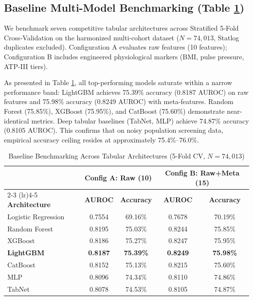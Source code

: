 \documentclass[journal]{IEEEtran}
\begin{document}
\subsection{Baseline Multi-Model Benchmarking (Table \ref{tab:baseline_benchmark})}
We benchmark seven competitive tabular architectures across Stratified 5-Fold Cross-Validation on the harmonized multi-cohort dataset ($N=74,013$, Statlog duplicates excluded). Configuration A evaluates raw features (10 features); Configuration B includes engineered physiological markers ($\text{BMI}$, pulse pressure, ATP-III tiers).

As presented in Table \ref{tab:baseline_benchmark}, all top-performing models saturate within a narrow performance band: LightGBM achieves 75.39\% accuracy (0.8187 AUROC) on raw features and 75.98\% accuracy (0.8249 AUROC) with meta-features. Random Forest (75.85\%), XGBoost (75.95\%), and CatBoost (75.60\%) demonstrate near-identical metrics. Deep tabular baselines (TabNet, MLP) achieve 74.87\% accuracy (0.8105 AUROC). This confirms that on noisy population screening data, empirical accuracy ceiling resides at approximately 75.4\%--76.0\%.

\begin{table}[t]
\caption{Baseline Benchmarking Across Tabular Architectures (5-Fold CV, $N=74,013$)}
\label{tab:baseline_benchmark}
\centering
\begin{tabular}{lcccc}
\toprule
 & \multicolumn{2}{c}{\textbf{Config A: Raw (10)}} & \multicolumn{2}{c}{\textbf{Config B: Raw+Meta (15)}} \\
\cmidrule(lr){2-3} \cmidrule(lr){4-5}
\textbf{Architecture} & \textbf{AUROC} & \textbf{Accuracy} & \textbf{AUROC} & \textbf{Accuracy} \\
\midrule
Logistic Regression & 0.7554 & 69.16\% & 0.7678 & 70.19\% \\
Random Forest       & 0.8195 & 75.03\% & 0.8244 & 75.85\% \\
XGBoost             & 0.8186 & 75.27\% & 0.8247 & 75.95\% \\
\textbf{LightGBM}   & \textbf{0.8187} & \textbf{75.39\%} & \textbf{0.8249} & \textbf{75.98\%} \\
CatBoost            & 0.8152 & 75.13\% & 0.8215 & 75.60\% \\
MLP                 & 0.8096 & 74.34\% & 0.8110 & 74.86\% \\
TabNet              & 0.8078 & 74.53\% & 0.8105 & 74.87\% \\
\bottomrule
\end{tabular}
\end{table}
\end{document}
